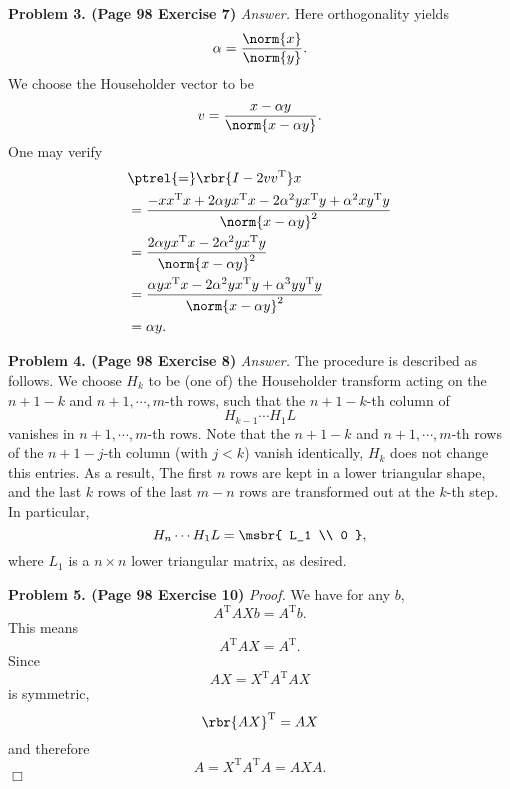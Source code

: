 \documentclass[english, nochinese]{pnote}
\begin{document}
\textbf{Problem 3. (Page 98 Exercise 7)} \textit{Answer.} Here orthogonality yields
\begin{equation}
\alpha = \frac{\norm{x}}{\norm{y}}.
\end{equation}
We choose the Householder vector to be
\begin{equation}
v = \frac{ x - \alpha y }{\norm{ x - \alpha y }}.
\end{equation}
One may verify
\begin{equation}
\begin{split}
&\ptrel{=} \rbr{ I - 2 v v^{\text{T}} } x \\
&= \frac{ -x x^{\text{T}} x + 2 \alpha y x^{\text{T}} x - 2 \alpha^2 y x^{\text{T}} y + \alpha^2 x y^{\text{T}} y }{\norm{ x - \alpha y }^2} \\
&= \frac{ 2 \alpha y x^{\text{T}} x - 2 \alpha^2 y x^{\text{T}} y }{\norm{ x - \alpha y }^2} \\
&= \frac{ \alpha y x^{\text{T}} x - 2 \alpha^2 y x^{\text{T}} y + \alpha^3 y y^{\text{T}} y }{\norm{ x - \alpha y }^2} \\
&= \alpha y.
\end{split}
\end{equation}

\textbf{Problem 4. (Page 98 Exercise 8)} \textit{Answer.} The procedure is described as follows. We choose $H_k$ to be (one of) the Householder transform acting on the $ n + 1 - k $ and $ n + 1, \cdots, m $-th rows, such that the $ n + 1 - k $-th column of
\begin{equation}
H_{ k - 1 } \cdots H_1 L
\end{equation}
vanishes in $ n + 1, \cdots, m $-th rows. Note that the $ n + 1 - k $ and $ n + 1, \cdots, m $-th rows of the $ n + 1 - j $-th column (with $ j < k $) vanish identically, $H_k$ does not change this entries. As a result, The first $n$ rows are kept in a lower triangular shape, and the last $k$ rows of the last $ m - n $ rows are transformed out at the $k$-th step. In particular,
\begin{equation}
H_n \cdots H_1 L = \msbr{ L_1 \\ 0 },
\end{equation}
where $L_1$ is a $ n \times n $ lower triangular matrix, as desired.

\textbf{Problem 5. (Page 98 Exercise 10)} \textit{Proof.} We have for any $b$,
\begin{equation}
A^{\text{T}} A X b = A^{\text{T}} b.
\end{equation}
This means
\begin{equation}
A^{\text{T}} A X = A^{\text{T}}.
\end{equation}
Since
\begin{equation}
A X = X^{\text{T}} A^{\text{T}} A X
\end{equation}
is symmetric,
\begin{equation}
\rbr{ A X }^{\text{T}} = A X
\end{equation}
and therefore
\begin{equation}
A = X^{\text{T}} A^{\text{T}} A = A X A.
\end{equation}
\hfill$\Box$
\end{document}
